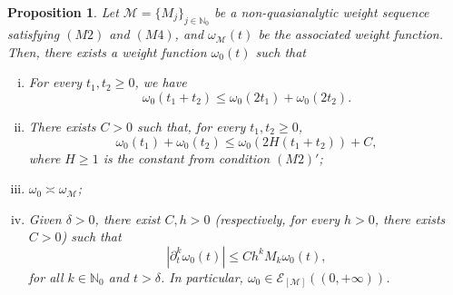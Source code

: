 \documentclass[11pt,reqno]{amsart}
\numberwithin{equation}{section}
\newtheorem{proposition}[theorem]{Proposition}
\newcommand{\N}{{\mathbb{N}}} %
\newcommand{\E}{{\mathcal{E}}}
\newcommand{\Mj}{{\{M_j\}_{j\in\mathbb{N}_0}}} %
\newcommand{\M}{{\mathcal{M}}} %
\begin{document}
\begin{proposition}\label{prop_wf_E}
	Let $\M=\Mj$ be a non-quasianalytic weight sequence satisfying $(M2)$ and $(M4)$, and $\omega_\M(t)$ be the associated weight function. Then, there exists a weight function $\omega_0(t)$ such that
	\begin{enumerate}[(i)]
		\item For every $t_1,t_2\geq 0$, we have
		\[\omega_0(t_1+t_2)\leq \omega_0(2t_1)+\omega_0(2t_2).\]
		
		\item There exists $C>0$ such that, for every $t_1,t_2\geq 0$,
		\[\omega_0(t_1)+\omega_0(t_2)\leq \omega_0(2H(t_1+t_2))+C,\]
		where $H\geq 1$ is the constant from condition $(M2)'$;
		
		\item $\omega_0\asymp \omega_\M$;
		
		\item Given $\delta>0$, there exist $C,h>0$ (respectively, for every $h>0$, there exists $C>0$) such that %
		\[|\partial_{t}^{k}\omega_0(t)|\leq Ch^{k}M_{k} \omega_0(t),\]
		for all $k\in\N_0$ and $t>\delta$. In particular, $\omega_0 \in \E_{[\M]}((0,+\infty))$.
	\end{enumerate}
\end{proposition}
%
\end{document}
